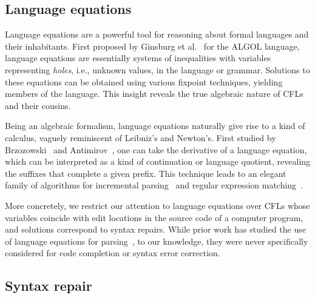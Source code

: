 \documentclass[sigplan,acmsmall,nonacm,screen]{acmart}\settopmatter{printfolios=false,printccs=false,printacmref=false}
\begin{document}
\subsection{Language equations}

Language equations are a powerful tool for reasoning about formal languages and their inhabitants. First proposed by Ginsburg et al.~\cite{ginsburg1962two} for the ALGOL language, language equations are essentially systems of inequalities with variables representing \textit{holes}, i.e., unknown values, in the language or grammar. Solutions to these equations can be obtained using various fixpoint techniques, yielding members of the language. This insight reveals the true algebraic nature of CFLs and their cousins.

Being an algebraic formalism, language equations naturally give rise to a kind of calculus, vaguely reminiscent of Leibniz's and Newton's. First studied by Brzozowski~\cite{brzozowski1964derivatives, brzozowski1980equations} and Antimirov~\cite{antimirov1996partial}, one can take the derivative of a language equation, which can be interpreted as a kind of continuation or language quotient, revealing the suffixes that complete a given prefix. This technique leads to an elegant family of algorithms for incremental parsing~\cite{might2011parsing, adams2016complexity} and regular expression matching~\cite{stanford2021symbolic,varatalu2025re}.


More concretely, we restrict our attention to language equations over CFLs whose variables coincide with edit locations in the source code of a computer program, and solutions correspond to syntax repairs. While prior work has studied the use of language equations for parsing~\cite{might2011parsing}, to our knowledge, they were never specifically considered for code completion or syntax error correction.

\subsection{Syntax repair}
\end{document}
